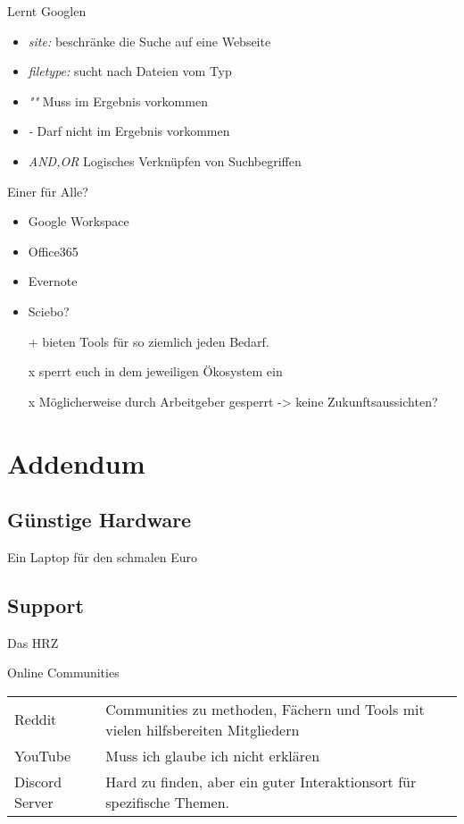 \documentclass[aspectratio=169,shownotes]{beamer}
\begin{document}
\begin{frame}{Lernt Googlen}
    \begin{itemize}
        \item \textit{site:} beschränke die Suche auf eine Webseite
        \item \textit{filetype:} sucht nach Dateien vom Typ
        \item \textit{""}  Muss im Ergebnis vorkommen
        \item \textit{-} Darf nicht im Ergebnis vorkommen
        \item \textit{AND,OR} Logisches Verknüpfen von Suchbegriffen
    \end{itemize}
\end{frame}
\begin{frame}{Einer für Alle?}
    \begin{itemize}
        \item Google Workspace
        \item Office365
        \item Evernote
        \item Sciebo?
    \end{itemize}
    
    \begin{itemize}
        \item[+] bieten Tools für so ziemlich jeden Bedarf.
        \item[x] sperrt euch in dem jeweiligen Ökosystem ein
        \item[x] Möglicherweise durch Arbeitgeber gesperrt -> keine Zukunftsaussichten?
    \end{itemize}  
\end{frame}
\section{Addendum}
\subsection{Günstige Hardware}
\begin{frame}{Ein Laptop für den schmalen Euro}
    
\end{frame}
\subsection{Support}
\begin{frame}{Das HRZ}
    
\end{frame}
\begin{frame}{Online Communities}
    \begin{tabularx}{\linewidth}{ll}
        Reddit & Communities zu methoden, Fächern und Tools mit vielen hilfsbereiten Mitgliedern\\
        YouTube & Muss ich glaube ich nicht erklären\\
        Discord Server & Hard zu finden, aber ein guter Interaktionsort für spezifische Themen.\\

    \end{tabularx}
\end{frame}
\end{document}

